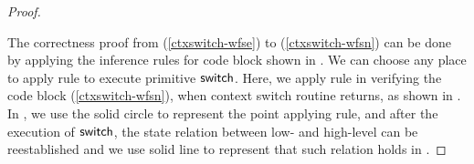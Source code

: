 \begin{proof}
    \begin{center}
        
        \vspace*{-0.5em}
        \label{fig:refinement reasoning}
    \end{center}

    The correctness proof from
    (\ref{ctxswitch-wfse}) to (\ref{ctxswitch-wfsn})
    can be done by applying the inference rules for
    code block shown in
    \Fig{\ref{fig:Selected Inference Rules for Refinement Verification}}.
    We can choose any place to apply
     rule to execute primitive $\mathsf{switch}$.
    Here, we apply  rule
    in verifying the code block
    \SwitchNewTask{} (\ref{ctxswitch-wfsn}),
    when context switch routine returns,
    as shown in \Fig{\ref{fig:refinement reasoning}}.
    In \Fig{\ref{fig:refinement reasoning}}, we use the
    solid circle to represent the point applying  rule,
    and after the execution of $\mathsf{switch}$, the
    state relation between low- and high-level can
    be reestablished and we use solid line to represent
    that such relation holds in \Fig{\ref{fig:refinement reasoning}}.
\end{proof}

